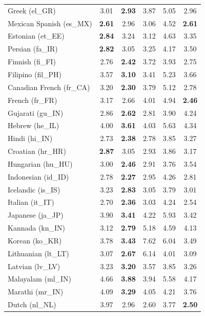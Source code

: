 \begin{longtable}{@{}lccccc@{}}
    Greek (el\_GR) & 3.01 & \textbf{2.93} & 3.87 & 5.05 & 2.96 \\
    Mexican Spanish (es\_MX) & \textbf{2.61} & 2.96 & 3.06 & 4.52 & \textbf{2.61} \\
    Estonian (et\_EE) & \textbf{2.84} & 3.24 & 3.12 & 4.63 & 3.35 \\
    Persian (fa\_IR) & \textbf{2.82} & 3.05 & 3.25 & 4.17 & 3.50 \\
    Finnish (fi\_FI) & 2.76 & \textbf{2.42} & 3.72 & 3.93 & 2.75 \\
    Filipino (fil\_PH) & 3.57 & \textbf{3.10} & 3.41 & 5.23 & 3.66 \\
    Canadian French (fr\_CA) & 3.20 & \textbf{2.30} & 3.79 & 5.12 & 2.78 \\
    French (fr\_FR) & 3.17 & 2.66 & 4.01 & 4.94 & \textbf{2.46} \\
    Gujarati (gu\_IN) & 2.86 & \textbf{2.62} & 2.81 & 3.90 & 4.24 \\
    Hebrew (he\_IL) & 4.00 & \textbf{3.61} & 4.03 & 5.63 & 4.34 \\
    Hindi (hi\_IN) & 2.73 & \textbf{2.38} & 2.78 & 3.85 & 3.27 \\
    Croatian (hr\_HR) & \textbf{2.87} & 3.05 & 2.93 & 3.86 & 3.17 \\
    Hungarian (hu\_HU) & 3.00 & \textbf{2.46} & 2.91 & 3.76 & 3.54 \\
    Indonesian (id\_ID) & 2.78 & \textbf{2.27} & 2.95 & 4.26 & 2.81 \\
    Icelandic (is\_IS) & 3.23 & \textbf{2.83} & 3.05 & 3.79 & 3.01 \\
    Italian (it\_IT) & 2.70 & \textbf{2.36} & 3.03 & 4.24 & 2.54 \\
    Japanese (ja\_JP) & 3.90 & \textbf{3.41} & 4.22 & 5.93 & 3.42 \\
    Kannada (kn\_IN) & 3.12 & \textbf{2.79} & 5.18 & 4.59 & 4.13 \\
    Korean (ko\_KR) & 3.78 & \textbf{3.43} & 7.62 & 6.04 & 3.49 \\
    Lithuanian (lt\_LT) & 3.07 & \textbf{2.67} & 6.14 & 4.01 & 3.09 \\
    Latvian (lv\_LV) & 3.23 & \textbf{3.20} & 3.57 & 3.85 & 3.26 \\
    Malayalam (ml\_IN) & 4.66 & \textbf{3.88} & 3.94 & 5.58 & 4.17 \\
    Marathi (mr\_IN) & 4.09 & \textbf{3.29} & 4.05 & 4.21 & 3.76 \\
    Dutch (nl\_NL) & 3.97 & 2.96 & 2.60 & 3.77 & \textbf{2.50} \\

\end{longtable}
